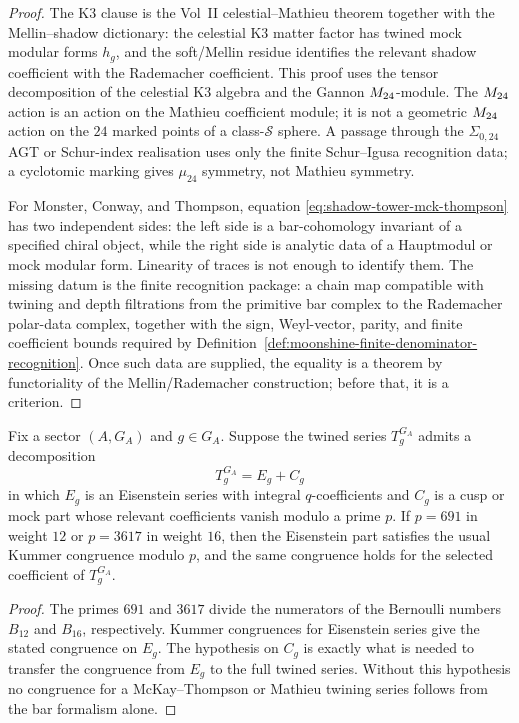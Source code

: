 \begin{proof}
The K3 clause is the Vol~II celestial--Mathieu theorem together
with the Mellin--shadow dictionary: the celestial K3 matter factor
has twined mock modular forms $h_g$, and the soft/Mellin residue
identifies the relevant shadow coefficient with the Rademacher
coefficient.  This proof uses the tensor decomposition of the
celestial K3 algebra and the Gannon $M_{24}$-module.  The $M_{24}$ action
is an action on the Mathieu coefficient module; it is not a geometric
$M_{24}$ action on the $24$ marked points of a class-$\mathcal S$
sphere.  A passage through the $\Sigma_{0,24}$ AGT or Schur-index
realisation uses only the finite Schur--Igusa recognition data; a
cyclotomic marking gives $\mu_{24}$ symmetry, not Mathieu symmetry.

For Monster, Conway, and Thompson, equation
\eqref{eq:shadow-tower-mck-thompson} has two independent sides:
the left side is a bar-cohomology invariant of a specified chiral
object, while the right side is analytic data of a Hauptmodul or
mock modular form.  Linearity of traces is not enough to identify
them.  The missing datum is the finite recognition package: a chain
map compatible with twining and depth filtrations from the primitive
bar complex to the Rademacher polar-data complex, together with the
sign, Weyl-vector, parity, and finite coefficient bounds required by
Definition~\ref{def:moonshine-finite-denominator-recognition}.  Once
such data are supplied, the equality is a theorem by functoriality of
the Mellin/Rademacher construction; before that, it is a criterion.
\end{proof}

\begin{corollary}
\label{cor:kummer-congruence-moonshine}
Fix a sector $(A,G_A)$ and $g\in G_A$.  Suppose the twined series
$T^{G_A}_g$ admits a decomposition
\[
 T^{G_A}_g = E_g + C_g
\]
in which $E_g$ is an Eisenstein series with integral $q$-coefficients
and $C_g$ is a cusp or mock part whose relevant coefficients vanish
modulo a prime $p$.  If $p=691$ in weight $12$ or $p=3617$ in weight
$16$, then the Eisenstein part satisfies the usual Kummer congruence
modulo $p$, and the same congruence holds for the selected coefficient
of $T^{G_A}_g$.
\end{corollary}

\begin{proof}
The primes $691$ and $3617$ divide the numerators of the Bernoulli
numbers $B_{12}$ and $B_{16}$, respectively.  Kummer congruences for
Eisenstein series give the stated congruence on $E_g$.  The
hypothesis on $C_g$ is exactly what is needed to transfer the
congruence from $E_g$ to the full twined series.  Without this
hypothesis no congruence for a McKay--Thompson or Mathieu twining
series follows from the bar formalism alone.
\end{proof}

